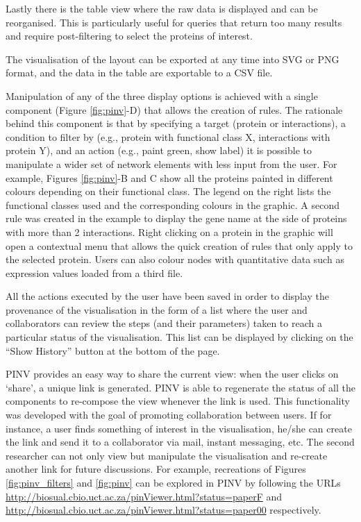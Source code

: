 Lastly there is the table view where the raw data is displayed and can be reorganised. This is particularly useful for queries that return too many results and require post-filtering to select the proteins of interest.

The visualisation of the layout can be exported at any time into SVG or PNG format, and the data in the table are exportable to a CSV file.

Manipulation of any of the three display options is achieved with a single component (Figure \ref{fig:pinv}-D) that allows the creation of rules. The rationale behind this component is that by specifying a target (protein or interactions), a condition to filter by (e.g., protein with functional class X, interactions with protein Y), and an action (e.g., paint green, show label) it is possible to manipulate a wider set of network elements with less input from the user. For example, Figures \ref{fig:pinv}-B and C show all the proteins painted in different colours depending on their functional class. The legend on the right lists the functional classes used and the corresponding colours in the graphic. A second rule was created in the example to display the gene name at the side of proteins with more than 2 interactions.
Right clicking on a protein in the graphic will open a contextual menu that allows the quick creation of rules that only apply to the selected protein. Users can also colour nodes with quantitative data such as expression values loaded from a third file.

All the actions executed by the user have been saved in order to display the provenance of the visualisation in the form of a list where the user and collaborators can review the steps (and their parameters) taken to reach a particular status of the visualisation. This list can be displayed by clicking on the “Show History” button at the bottom of the page. 

PINV provides an easy way to share the current view: when the user clicks on `share', a unique link is generated. PINV is able to regenerate the status of all the components to re-compose the view whenever the link is used. 
This functionality was developed with the goal of promoting collaboration between users. If for instance, a user finds something of interest in the visualisation, he/she can create the link and send it to a collaborator via mail, instant messaging, etc. The second researcher can not only view but manipulate the visualisation and re-create another link for future discussions. For example, recreations of Figures \ref{fig:pinv_filters} and \ref{fig:pinv} can be explored in PINV by following the URLs \url{http://biosual.cbio.uct.ac.za/pinViewer.html?status=paperF} and \url{http://biosual.cbio.uct.ac.za/pinViewer.html?status=paper00} respectively.

